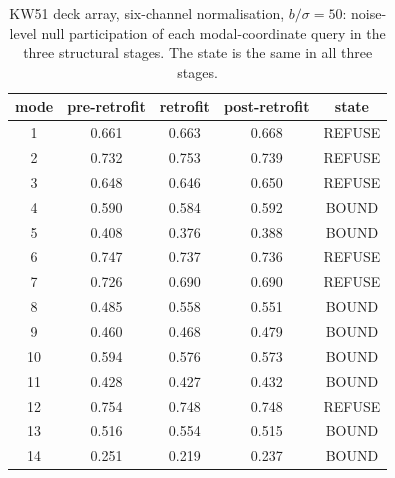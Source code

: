 \begin{table}[h]\centering\footnotesize
\caption{KW51 deck array, six-channel normalisation, $b/\sigma=50$: noise-level null participation of each modal-coordinate query in the three structural stages. The state is the same in all three stages.}\label{tab:s5}
\begin{tabular}{ccccc}\toprule mode & pre-retrofit & retrofit & post-retrofit & state\\ \midrule
1 & 0.661 & 0.663 & 0.668 & REFUSE \\
2 & 0.732 & 0.753 & 0.739 & REFUSE \\
3 & 0.648 & 0.646 & 0.650 & REFUSE \\
4 & 0.590 & 0.584 & 0.592 & BOUND \\
5 & 0.408 & 0.376 & 0.388 & BOUND \\
6 & 0.747 & 0.737 & 0.736 & REFUSE \\
7 & 0.726 & 0.690 & 0.690 & REFUSE \\
8 & 0.485 & 0.558 & 0.551 & BOUND \\
9 & 0.460 & 0.468 & 0.479 & BOUND \\
10 & 0.594 & 0.576 & 0.573 & BOUND \\
11 & 0.428 & 0.427 & 0.432 & BOUND \\
12 & 0.754 & 0.748 & 0.748 & REFUSE \\
13 & 0.516 & 0.554 & 0.515 & BOUND \\
14 & 0.251 & 0.219 & 0.237 & BOUND \\
\bottomrule\end{tabular}\end{table}